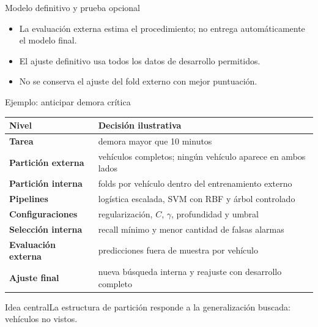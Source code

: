 \documentclass[aspectratio=169,10pt]{beamer}
\newcommand{\idea}[1]{\begin{block}{Idea central}#1\end{block}}
\begin{document}
\begin{frame}{Modelo definitivo y prueba opcional}
  \begin{center}
  \end{center}
  \begin{itemize}
    \item La evaluación externa estima el procedimiento; no entrega automáticamente el modelo final.
    \item El ajuste definitivo usa todos los datos de desarrollo permitidos.
    \item No se conserva el ajuste del fold externo con mejor puntuación.
  \end{itemize}
\end{frame}

\begin{frame}{Ejemplo: anticipar demora crítica}
  \scriptsize
  \begin{tabularx}{\textwidth}{>{\bfseries}p{}X}\toprule
  Nivel & Decisión ilustrativa\\\midrule
  Tarea & demora mayor que 10 minutos\\
  Partición externa & vehículos completos; ningún vehículo aparece en ambos lados\\
  Partición interna & folds por vehículo dentro del entrenamiento externo\\
  Pipelines & logística escalada, SVM con RBF y árbol controlado\\
  Configuraciones & regularización, $C$, $\gamma$, profundidad y umbral\\
  Selección interna & recall mínimo y menor cantidad de falsas alarmas\\
  Evaluación externa & predicciones fuera de muestra por vehículo\\
  Ajuste final & nueva búsqueda interna y reajuste con desarrollo completo\\\bottomrule
  \end{tabularx}
  \idea{La estructura de partición responde a la generalización buscada: vehículos no vistos.}
\end{frame}
\end{document}

